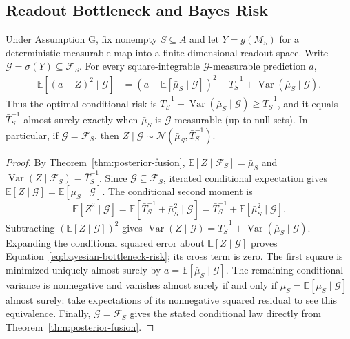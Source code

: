 \subsection{Readout Bottleneck and Bayes Risk}

\begin{mosaictheorem}\label{thm:bottleneck}
Under Assumption G, fix nonempty $S\subseteq A$ and let $Y=g(M_S)$ for a deterministic measurable map into a finite-dimensional readout space. Write $\mathcal{G}=\sigma(Y)\subseteq\mathcal{F}_S$. For every square-integrable $\mathcal{G}$-measurable prediction $a$,
\begin{equation}\label{eq:bayesian-bottleneck-risk}
\begin{aligned}
\mathbb{E}[(a-Z)^2\mid\mathcal{G}]
&=\left(a-\mathbb{E}[\bar\mu_S\mid\mathcal{G}]\right)^2
+\bar T_S^{-1}+\operatorname{Var}(\bar\mu_S\mid\mathcal{G}).
\end{aligned}
\end{equation}
Thus the optimal conditional risk is $\bar T_S^{-1}+\operatorname{Var}(\bar\mu_S\mid\mathcal{G})\geq\bar T_S^{-1}$, and it equals $\bar T_S^{-1}$ almost surely exactly when $\bar\mu_S$ is $\mathcal{G}$-measurable (up to null sets). In particular, if $\mathcal{G}=\mathcal{F}_S$, then $Z\mid\mathcal{G}\sim\mathcal{N}(\bar\mu_S,\bar T_S^{-1})$.
\end{mosaictheorem}
\begin{proof}
By Theorem~\ref{thm:posterior-fusion}, $\mathbb{E}[Z\mid\mathcal{F}_S]=\bar\mu_S$ and $\operatorname{Var}(Z\mid\mathcal{F}_S)=\bar T_S^{-1}$. Since $\mathcal{G}\subseteq\mathcal{F}_S$, iterated conditional expectation gives $\mathbb{E}[Z\mid\mathcal{G}]=\mathbb{E}[\bar\mu_S\mid\mathcal{G}]$. The conditional second moment is
\begin{equation}
\mathbb{E}[Z^2\mid\mathcal{G}]
=\mathbb{E}[\bar T_S^{-1}+\bar\mu_S^2\mid\mathcal{G}]
=\bar T_S^{-1}+\mathbb{E}[\bar\mu_S^2\mid\mathcal{G}].
\end{equation}
Subtracting $(\mathbb{E}[Z\mid\mathcal{G}])^2$ gives $\operatorname{Var}(Z\mid\mathcal{G})=\bar T_S^{-1}+\operatorname{Var}(\bar\mu_S\mid\mathcal{G})$. Expanding the conditional squared error about $\mathbb{E}[Z\mid\mathcal{G}]$ proves Equation~\eqref{eq:bayesian-bottleneck-risk}; its cross term is zero. The first square is minimized uniquely almost surely by $a=\mathbb{E}[\bar\mu_S\mid\mathcal{G}]$. The remaining conditional variance is nonnegative and vanishes almost surely if and only if $\bar\mu_S=\mathbb{E}[\bar\mu_S\mid\mathcal{G}]$ almost surely: take expectations of its nonnegative squared residual to see this equivalence. Finally, $\mathcal{G}=\mathcal{F}_S$ gives the stated conditional law directly from Theorem~\ref{thm:posterior-fusion}.
\end{proof}

